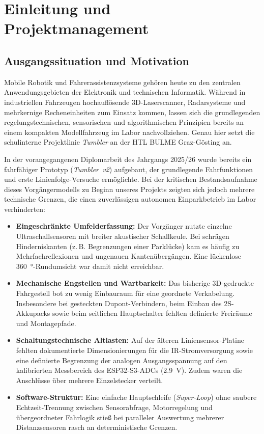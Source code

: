 \chapter{Einleitung und Projektmanagement}
\label{chap:einleitung}

\section{Ausgangssituation und Motivation}
\label{sec:motivation}
Mobile Robotik und Fahrerassistenzsysteme gehören heute zu den zentralen Anwendungsgebieten der Elektronik und technischen Informatik. Während in industriellen Fahrzeugen hochauflösende 3D-Laserscanner, Radarsysteme und mehrkernige Recheneinheiten zum Einsatz kommen, lassen sich die grundlegenden regelungstechnischen, sensorischen und algorithmischen Prinzipien bereits an einem kompakten Modellfahrzeug im Labor nachvollziehen. Genau hier setzt die schulinterne Projektlinie \emph{Tumbler} an der HTL BULME Graz-Gösting an.

In der vorangegangenen Diplomarbeit des Jahrgangs 2025/26 \cite{Kloeckl2026} wurde bereits ein fahrfähiger Prototyp (\emph{Tumbler~v2}) aufgebaut, der grundlegende Fahrfunktionen und erste Linienfolge-Versuche ermöglichte. Bei der kritischen Bestandsaufnahme dieses Vorgängermodells zu Beginn unseres Projekts zeigten sich jedoch mehrere technische Grenzen, die einen zuverlässigen autonomen Einparkbetrieb im Labor verhinderten:

\begin{itemize}
  \item \textbf{Eingeschränkte Umfelderfassung:} Der Vorgänger nutzte einzelne Ultraschallsensoren mit breiter akustischer Schallkeule. Bei schrägen Hinderniskanten (z.\,B. Begrenzungen einer Parklücke) kam es häufig zu Mehrfachreflexionen und ungenauen Kantenübergängen. Eine lückenlose \qty{360}{\degree}-Rundumsicht war damit nicht erreichbar.
  \item \textbf{Mechanische Engstellen und Wartbarkeit:} Das bisherige 3D-gedruckte Fahrgestell bot zu wenig Einbauraum für eine geordnete Verkabelung. Insbesondere bei gesteckten Dupont-Verbindern, beim Einbau des 2S-Akkupacks sowie beim seitlichen Hauptschalter fehlten definierte Freiräume und Montagepfade.
  \item \textbf{Schaltungstechnische Altlasten:} Auf der älteren Liniensensor-Platine fehlten dokumentierte Dimensionierungen für die IR-Stromversorgung sowie eine definierte Begrenzung der analogen Ausgangsspannung auf den kalibrierten Messbereich des ESP32-S3-ADCs (\qty{2,9}{\volt}). Zudem waren die Anschlüsse über mehrere Einzelstecker verteilt.
  \item \textbf{Software-Struktur:} Eine einfache Hauptschleife (\emph{Super-Loop}) ohne saubere Echtzeit-Trennung zwischen Sensorabfrage, Motorregelung und übergeordneter Fahrlogik stieß bei paralleler Auswertung mehrerer Distanzsensoren rasch an deterministische Grenzen.
\end{itemize}

